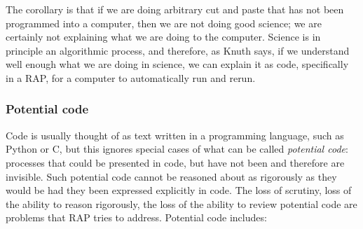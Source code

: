 \documentclass{comjnl}
\begin{document}
The corollary is that if we are doing arbitrary cut and paste that has not been programmed into a computer, then we are not doing good science; we are certainly not explaining what we are doing to the computer. Science is in principle an algorithmic process, and therefore, as Knuth says, if we understand well enough what we are doing in science, we can explain it as code, specifically in a RAP, for a computer to automatically run and rerun.

\subsubsection{Potential code}
Code is usually thought of as text written in a programming language, such as Python or C, but this ignores special cases of what can be called \emph{potential code\/}: processes that could be presented in code, but have not been and therefore are invisible. Such potential code cannot be reasoned about as rigorously as they would be had they been expressed explicitly in code. The loss of scrutiny, loss of the ability to reason rigorously, the loss of the  ability to review potential code are problems that RAP tries to address. Potential code includes:
\end{document}
